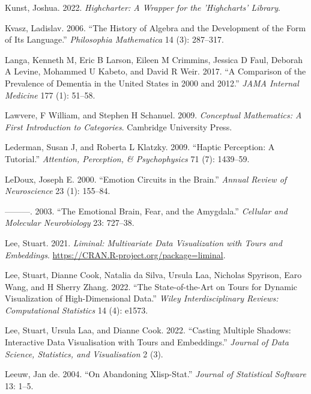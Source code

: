 \documentclass[
]{book}
\newlength{\cslhangindent}
\newenvironment{CSLReferences}[2] %
 {\begin{list}{}{%
  \setlength{\itemindent}{0pt}
  \setlength{\leftmargin}{0pt}
  \setlength{\parsep}{0pt}
  \ifodd #1
   \setlength{\leftmargin}{\cslhangindent}
   \setlength{\itemindent}{-1\cslhangindent}
  \fi
  \setlength{\itemsep}{#2\baselineskip}}}
 {\end{list}}
\theoremstyle{definition}
\theoremstyle{definition}
\theoremstyle{definition}
\theoremstyle{definition}
\theoremstyle{remark}
\begin{document}
\begin{CSLReferences}{1}{0}
Kunst, Joshua. 2022. \emph{Highcharter: A Wrapper for the 'Highcharts' Library}.

Kvasz, Ladislav. 2006. {``The History of Algebra and the Development of the Form of Its Language.''} \emph{Philosophia Mathematica} 14 (3): 287--317.

Langa, Kenneth M, Eric B Larson, Eileen M Crimmins, Jessica D Faul, Deborah A Levine, Mohammed U Kabeto, and David R Weir. 2017. {``A Comparison of the Prevalence of Dementia in the United States in 2000 and 2012.''} \emph{JAMA Internal Medicine} 177 (1): 51--58.

Lawvere, F William, and Stephen H Schanuel. 2009. \emph{Conceptual Mathematics: A First Introduction to Categories}. Cambridge University Press.

Lederman, Susan J, and Roberta L Klatzky. 2009. {``Haptic Perception: A Tutorial.''} \emph{Attention, Perception, \& Psychophysics} 71 (7): 1439--59.

LeDoux, Joseph E. 2000. {``Emotion Circuits in the Brain.''} \emph{Annual Review of Neuroscience} 23 (1): 155--84.

---------. 2003. {``The Emotional Brain, Fear, and the Amygdala.''} \emph{Cellular and Molecular Neurobiology} 23: 727--38.

Lee, Stuart. 2021. \emph{Liminal: Multivariate Data Visualization with Tours and Embeddings}. \url{https://CRAN.R-project.org/package=liminal}.

Lee, Stuart, Dianne Cook, Natalia da Silva, Ursula Laa, Nicholas Spyrison, Earo Wang, and H Sherry Zhang. 2022. {``The State-of-the-Art on Tours for Dynamic Visualization of High-Dimensional Data.''} \emph{Wiley Interdisciplinary Reviews: Computational Statistics} 14 (4): e1573.

Lee, Stuart, Ursula Laa, and Dianne Cook. 2022. {``Casting Multiple Shadows: Interactive Data Visualisation with Tours and Embeddings.''} \emph{Journal of Data Science, Statistics, and Visualisation} 2 (3).

Leeuw, Jan de. 2004. {``On Abandoning Xlisp-Stat.''} \emph{Journal of Statistical Software} 13: 1--5.


\end{CSLReferences}
\end{document}
